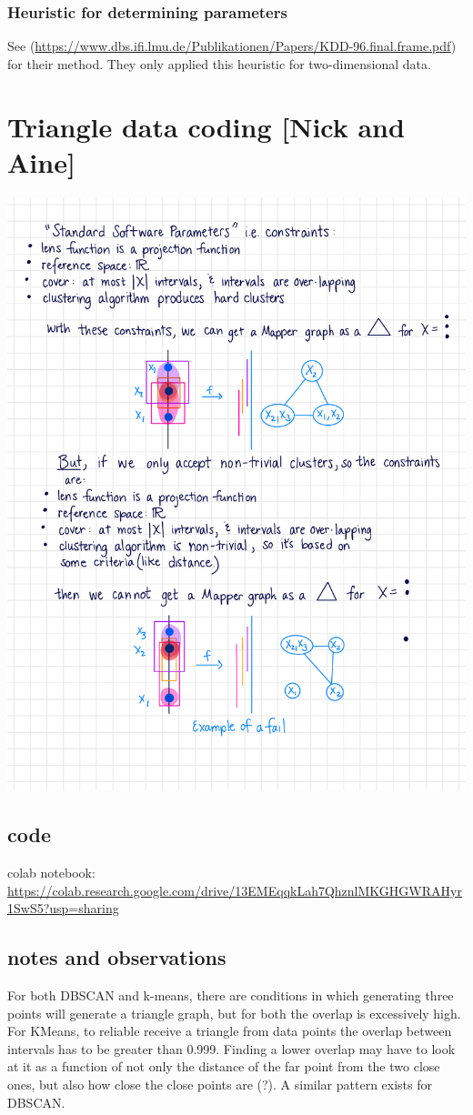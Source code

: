 \documentclass{article}
\begin{document}
\subsubsection{Heuristic for determining parameters}
See \cite[Section 4.2]{DBSCAN} (\url{https://www.dbs.ifi.lmu.de/Publikationen/Papers/KDD-96.final.frame.pdf}) for their method. They only applied this heuristic for two-dimensional data.
\section{Triangle data coding [Nick and Aine]}

\includegraphics[]{Example.pdf}
\subsection{code}
colab notebook: \url{https://colab.research.google.com/drive/13EMEqqkLah7QhznlMKGHGWRAHyr1SwS5?usp=sharing}
\subsection{notes and observations}
For both DBSCAN and k-means, there are conditions in which generating three points will generate a triangle graph, but for both the overlap is excessively high. For KMeans, to reliable receive a triangle from data points the overlap between intervals has to be greater than 0.999. Finding a lower overlap may have to look at it as a function of not only the distance of the far point from the two close ones, but also how close the close points are (?). A similar pattern exists for DBSCAN. 
\end{document}
